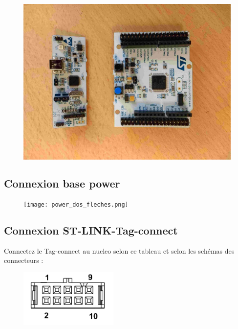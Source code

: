 \documentclass{article}
\begin{document}
\begin{figure}[H]
\begin{center}
\advance\leftskip-3cm
\advance\rightskip-3cm
\includegraphics[keepaspectratio=true,scale=0.1]{nucleo_debug.jpg}
\label{visina8}
\end{center}\end{figure}

\subsection{Connexion base power}

\begin{figure}[H]
\begin{center}
\advance\leftskip-3cm
\advance\rightskip-3cm
\texttt{[image: power\_dos\_fleches.png]}
\label{visina8}
\end{center}\end{figure}


\subsection {Connexion ST-LINK-Tag-connect}

Connectez le Tag-connect au nucleo selon ce tableau et selon les schémas des connecteurs :

\begin{figure}[H]
\begin{center}
\advance\leftskip-3cm
\advance\rightskip-3cm
\includegraphics[keepaspectratio=true,scale=0.5]{tag_connectpinout.png}
\label{visina8}
\end{center}\end{figure}
\end{document}
